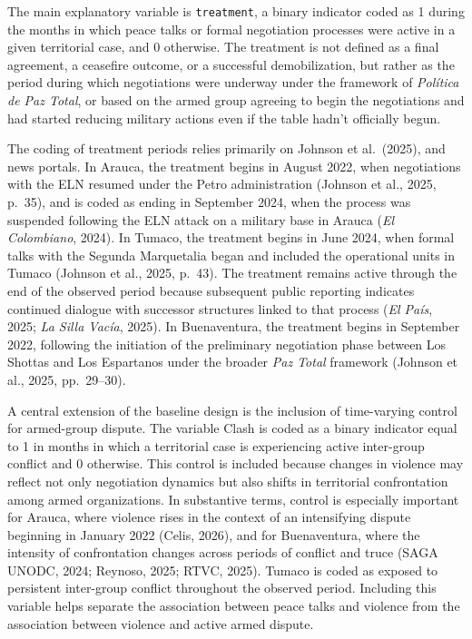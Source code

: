 \documentclass[11pt]{article}
\begin{document}
The main explanatory variable is \texttt{treatment}, a binary indicator coded as 1 during the months in which peace talks or formal negotiation processes were active in a given territorial case, and 0 otherwise. The treatment is not defined as a final agreement, a ceasefire outcome, or a successful demobilization, but rather as the period during which negotiations were underway under the framework of \textit{Pol\'itica de Paz Total}, or based on the armed group agreeing to begin the negotiations and had started reducing military actions even if the table hadn't officially begun.

The coding of treatment periods relies primarily on Johnson et al.~(2025), and news portals. In Arauca, the treatment begins in August 2022, when negotiations with the ELN resumed under the Petro administration (Johnson et al., 2025, p.~35), and is coded as ending in September 2024, when the process was suspended following the ELN attack on a military base in Arauca (\textit{El Colombiano}, 2024). In Tumaco, the treatment begins in June 2024, when formal talks with the Segunda Marquetalia began and included the operational units in Tumaco (Johnson et al., 2025, p.~43). The treatment remains active through the end of the observed period because subsequent public reporting indicates continued dialogue with successor structures linked to that process (\textit{El País}, 2025; \textit{La Silla Vacía}, 2025). In Buenaventura, the treatment begins in September 2022, following the initiation of the preliminary negotiation phase between Los Shottas and Los Espartanos under the broader \textit{Paz Total} framework (Johnson et al., 2025, pp.~29--30).

A central extension of the baseline design is the inclusion of time-varying control for armed-group dispute. The variable Clash is coded as a binary indicator equal to 1 in months in which a territorial case is experiencing active inter-group conflict and 0 otherwise. This control is included because changes in violence may reflect not only negotiation dynamics but also shifts in territorial confrontation among armed organizations. In substantive terms, control is especially important for Arauca, where violence rises in the context of an intensifying dispute beginning in January 2022 (Celis, 2026), and for Buenaventura, where the intensity of confrontation changes across periods of conflict and truce (SAGA UNODC, 2024; Reynoso, 2025; RTVC, 2025). Tumaco is coded as exposed to persistent inter-group conflict throughout the observed period. Including this variable helps separate the association between peace talks and violence from the association between violence and active armed dispute.
\end{document}
